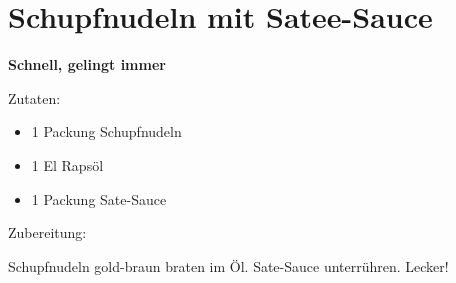 \section{Schupfnudeln mit Satee-Sauce}

\textbf{Schnell, gelingt immer}

Zutaten:
\begin{itemize}
    \item 1 Packung Schupfnudeln
    \item 1 El Rapsöl
    \item 1 Packung Sate-Sauce
\end{itemize}

Zubereitung:

Schupfnudeln gold-braun braten im Öl. Sate-Sauce unterrühren. Lecker!

\newpage
\mbox{}
\vfill
\begin{center}
\end{center}
\vfill
\mbox{ }
\newpage
